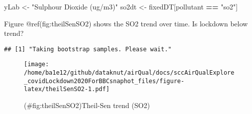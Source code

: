 \documentclass[]{article}
\newenvironment{Shaded}{\begin{snugshade}}{\end{snugshade}}
\newcommand{\KeywordTok}[1]{\textcolor[rgb]{0.13,0.29,0.53}{\textbf{#1}}}
\newcommand{\DataTypeTok}[1]{\textcolor[rgb]{0.13,0.29,0.53}{#1}}
\newcommand{\DecValTok}[1]{\textcolor[rgb]{0.00,0.00,0.81}{#1}}
\newcommand{\StringTok}[1]{\textcolor[rgb]{0.31,0.60,0.02}{#1}}
\newcommand{\CommentTok}[1]{\textcolor[rgb]{0.56,0.35,0.01}{\textit{#1}}}
\newcommand{\OtherTok}[1]{\textcolor[rgb]{0.56,0.35,0.01}{#1}}
\newcommand{\OperatorTok}[1]{\textcolor[rgb]{0.81,0.36,0.00}{\textbf{#1}}}
\newcommand{\NormalTok}[1]{#1}
\begin{document}
\begin{Shaded}
\begin{Highlighting}[]
\NormalTok{yLab <-}\StringTok{ "Sulphour Dioxide (ug/m3)"}
\NormalTok{so2dt <-}\StringTok{ }\NormalTok{fixedDT[pollutant }\OperatorTok{==}\StringTok{ "so2"}\NormalTok{]}
\end{Highlighting}
\end{Shaded}

Figure @ref(fig:theilSenSO2) shows the SO2 trend over time. Is lockdown
below trend?

\begin{Shaded}
\end{Shaded}

\begin{verbatim}
## [1] "Taking bootstrap samples. Please wait."
\end{verbatim}

\begin{figure}
\centering
\texttt{[image: /home/ba1e12/github/dataknut/airQual/docs/sccAirQualExplore\_covidLockdown2020ForBBCsnaphot\_files/figure-latex/theilSenSO2-1.pdf]}
\caption{(\#fig:theilSenSO2)Theil-Sen trend (SO2)}
\end{figure}
\end{document}
